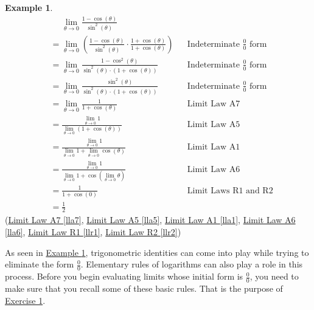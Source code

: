 \documentclass[12pt,]{book}
\theoremstyle{plain}
\theoremstyle{definition}
\newtheorem{example}[theorem]{Example}
\numberwithin{equation}{section}
\newcommand{\fe}[2]{#1\mathopen{}\left(#2\right)\mathclose{}}
\begin{document}
\begin{example}\label{example-second-indeterminate}
\begin{align*}
&\phantom{{}={}}\lim_{\theta\to0}\frac{1-\fe{\cos}{\theta}}{\fe{\sin^2}{\theta}}\\
&=\lim_{\theta\to0}\left(\frac{1-\fe{\cos}{\theta}}{\fe{\sin^2}{\theta}}\cdot\frac{1+\fe{\cos}{\theta}}{1+\fe{\cos}{\theta}}\right)&&\text{Indeterminate $\frac{0}{0}$ form}\\
&=\lim_{\theta\to0}\frac{1-\fe{\cos^2}{\theta}}{\fe{\sin^2}{\theta}\cdot\left(1+\fe{\cos}{\theta}\right)}&&\text{Indeterminate $\frac{0}{0}$ form}\\
&=\lim_{\theta\to0}\frac{\fe{\sin^2}{\theta}}{\fe{\sin^2}{\theta}\cdot\left(1+\fe{\cos}{\theta}\right)}&&\text{Indeterminate $\frac{0}{0}$ form}\\
&=\lim_{\theta\to0}\frac{1}{1+\fe{\cos}{\theta}}&&\text{Limit Law A7}\\
&=\frac{\lim_{\theta\to0}1}{\lim_{\theta\to0}\left(1+\fe{\cos}{\theta}\right)}&&\text{Limit Law A5}\\
&=\frac{\lim_{\theta\to0}1}{\lim_{\theta\to0}1+\lim_{\theta\to0}\fe{\cos}{\theta}}&&\text{Limit Law A1}\\
&=\frac{\lim_{\theta\to0}1}{\lim_{\theta\to0}1+\fe{\cos}{\lim_{\theta\to0}\theta}}&&\text{Limit Law A6}\\
&=\frac{1}{1+\fe{\cos}{0}}&&\text{Limit Laws R1 and R2}\\
&=\frac{1}{2}
\end{align*}(\hyperref[lla7]{Limit Law A7 \ref{lla7}}, \hyperref[lla5]{Limit Law A5 \ref{lla5}}, \hyperref[lla1]{Limit Law A1 \ref{lla1}}, \hyperref[lla6]{Limit Law A6 \ref{lla6}}, \hyperref[llr1]{Limit Law R1 \ref{llr1}}, \hyperref[llr2]{Limit Law R2 \ref{llr2}})%
\end{example}
\par
As seen in \hyperref[example-second-indeterminate]{Example \ref{example-second-indeterminate}}, trigonometric identities can come into play while trying to eliminate the form \(\frac{0}{0}\). Elementary rules of logarithms can also play a role in this process. Before you begin evaluating limits whose initial form is \(\frac{0}{0}\), you need to make sure that you recall some of these basic rules. That is the purpose of \hyperlink{exercise-identities-review}{Exercise 1}.%
\typeout{************************************************}
\typeout{************************************************}
\end{document}
